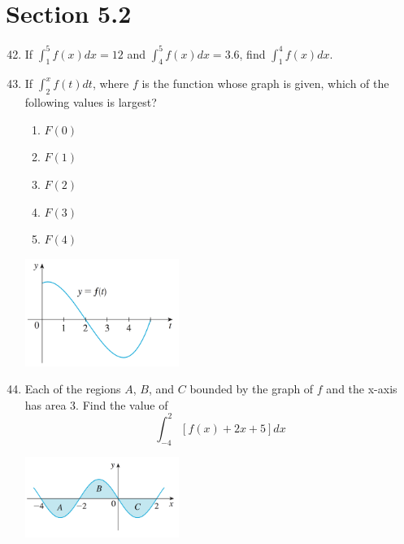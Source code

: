 \documentclass{article}
\begin{document}
\section{Section 5.2}
\begin{enumerate}
\setcounter{enumi}{41}
	\item If $\int_{1}^{5} f(x) dx=12$ and $\int_{4}^{5} f(x) dx=3.6$, find $\int_{1}^{4} f(x) dx$.\pagebreak
\setcounter{enumi}{47}
	\item If $\int_{2}^{x} f(t) dt$, where $f$ is the function whose graph is given, which of the following values is largest?
	\begin{enumerate}
		\item $F(0)$\newline\newline
		\item $F(1)$\newline\newline
		\item $F(2)$\newline\newline
		\item $F(3)$\newline\newline
		\item $F(4)$\newline\newline
	\end{enumerate}
	\begin{center}
		\includegraphics[width=5cm]{images/52pr48.png}
	\end{center}
	\item Each of the regions $A$, $B$, and $C$ bounded by the graph of $f$ and the x-axis has area 3. Find the value of $$\int_{-4}^{2} [f(x)+2x+5] dx$$
	\begin{center}
		\includegraphics[width=5cm]{images/52pr49.png}
	\end{center}
\end{enumerate}
\end{document}
